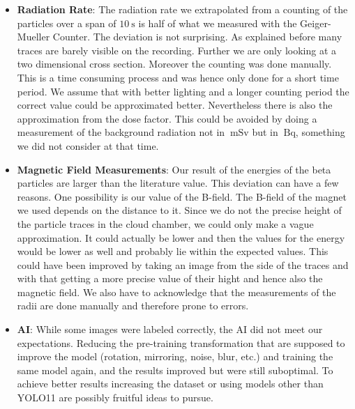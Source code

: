 \documentclass[10pt,a4paper]{article}
\begin{document}
\begin{itemize}
    \item \textbf{Radiation Rate}: The radiation rate we extrapolated from a counting of the particles over a span of \(\qty{10}{\second}\) is half of what we measured with the Geiger-Mueller Counter. The deviation is not surprising. As explained before many traces are barely visible on the recording. Further we are only looking at a two dimensional cross section. Moreover the counting was done manually. This is a time consuming process and was hence only done for a short time period. We assume that with better lighting and a longer counting period the correct value could be approximated better. Nevertheless there is also the approximation from the dose factor. This could be avoided by doing a measurement of the background radiation not in \(\qty{}{\milli\sievert}\) but in \(\qty{}{\becquerel }\), something we did not consider at that time.

    \item \textbf{Magnetic Field Measurements}: Our result of the energies of the beta particles are larger than the literature value. This deviation can have a few reasons. One possibility is our value of the B-field. The B-field of the magnet we used depends on the distance to it. Since we do not the precise height of the particle traces in the cloud chamber, we could only make a vague approximation. It could actually be lower and then the values for the energy would be lower as well and probably lie within the expected values. This could have been improved by taking an image from the side of the traces and with that getting a more precise value of their hight and hence also the magnetic field. We also have to acknowledge that the measurements of the radii are done manually and therefore prone to errors.
    
    \item \textbf{AI}: While some images were labeled correctly, the AI did not meet our expectations. Reducing the pre-training transformation that are supposed to improve the model (rotation, mirroring, noise, blur, etc.) and training the same model again, and the results improved but were still suboptimal. To achieve better results increasing the dataset or using models other than YOLO11 are possibly fruitful ideas to pursue.

\end{itemize}
\end{document}
